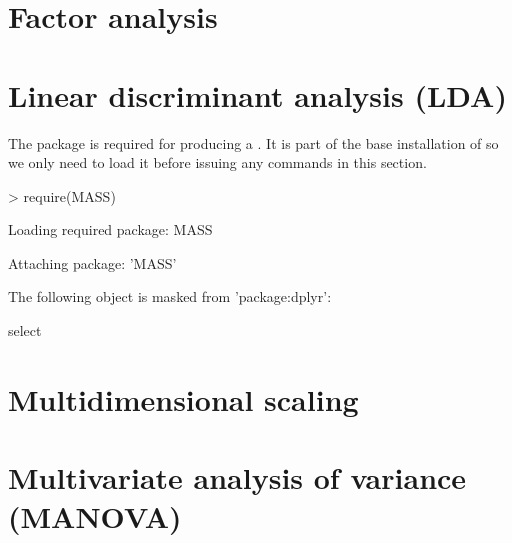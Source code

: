 \section{Factor analysis} 
 
\section{Linear discriminant analysis (LDA)} 
 
The  package is required for producing a . It is part of the base installation of \R{} so we only need to load it before issuing any commands in this section. 

\begin{Schunk}
\begin{Sinput}
> require(MASS) 
\end{Sinput}
\begin{Soutput}
Loading required package: MASS
\end{Soutput}
\begin{Soutput}

Attaching package: 'MASS'
\end{Soutput}
\begin{Soutput}
The following object is masked from 'package:dplyr':

    select
\end{Soutput}
\end{Schunk}

 
\section{Multidimensional scaling} 
 
\section{Multivariate analysis of variance (MANOVA)} 
 
 
\section{} 
 
 
\section{} 
 
 
\section{} 
 
 
\section{} 
 
 
\section{} 
 
 
\section{} 
 
 
 



